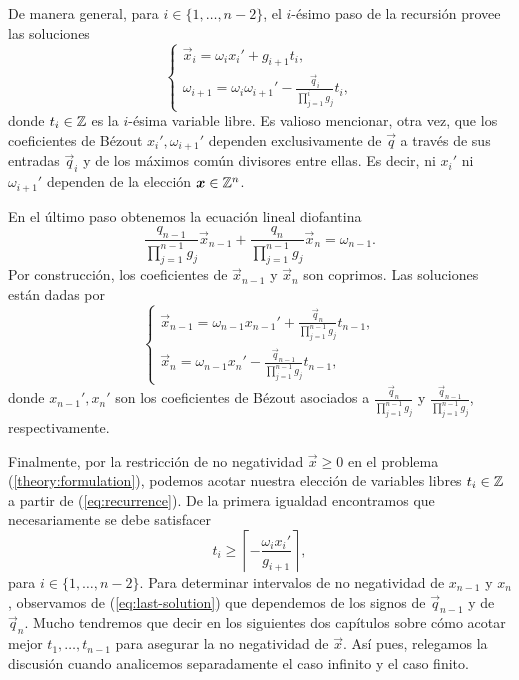 De manera general, para $i \in \lbrace 1, \ldots, n - 2 \rbrace$, el $i$-ésimo paso de la recursión
provee las soluciones
\begin{equation}
	\label{eq:recurrence}
	\begin{cases}
		\vec{x}_i = \omega_ix_i' + g_{i + 1}t_i, \\
		\omega_{i + 1} = \omega_i\omega_{i + 1}' - \frac{\vec{q}_i}{\prod_{j=1}^{i}g_j}t_i,
	\end{cases}
\end{equation}
donde $t_i \in \mathbb{Z}$ es la $i$-ésima variable libre. Es valioso mencionar, otra vez, que los
coeficientes de Bézout $x_i', \omega_{i+1}'$ dependen exclusivamente de $\vec{q}$ a través de sus
entradas $\vec{q}_i$ y de los máximos común divisores entre ellas. Es decir, ni $x_i'$ ni $\omega_{i
+ 1}'$ dependen de la elección $\boldsymbol{x} \in \mathbb{Z}^n$.

En el último paso obtenemos la ecuación lineal diofantina
\begin{equation}
	\label{eq:last-equation}
	\frac{q_{n-1}}{\prod_{j=1}^{n-1}g_j}\vec{x}_{n-1} +
	\frac{q_{n}}{\prod_{j=1}^{n-1}g_j}\vec{x}_n
	= \omega_{n-1}.
\end{equation}
Por construcción, los coeficientes de $\vec{x}_{n - 1}$ y $\vec{x}_n$ son coprimos. Las soluciones
están dadas por
\begin{equation}
	\label{eq:last-solution}
	\begin{cases}
		\vec{x}_{n-1} = \omega_{n-1}x_{n-1}' + \frac{\vec{q}_n}{\prod_{j=1}^{n-1}g_j}t_{n-1}, \\
		\vec{x}_n = \omega_{n-1}x_n' - \frac{\vec{q}_{n-1}}{\prod_{j=1}^{n-1}g_j}t_{n-1},
	\end{cases}
\end{equation}
donde $x_{n-1}', x_n'$ son los coeficientes de Bézout asociados a
$\frac{\vec{q}_n}{\prod_{j=1}^{n-1}g_j}$ y $\frac{\vec{q}_{n-1}}{\prod_{j=1}^{n-1}g_j}$,
respectivamente.

Finalmente, por la restricción de no negatividad $\vec{x} \geq 0$ en el problema
(\ref{theory:formulation}), podemos acotar nuestra elección de variables libres $t_i \in \mathbb{Z}$ a
partir de (\ref{eq:recurrence}). De la primera igualdad encontramos que necesariamente se debe
satisfacer
\begin{equation}
	\label{eq:param-lb}
	t_i \geq \left\lceil -\frac{\omega_ix_i'}{g_{i + 1}} \right\rceil,
\end{equation}
para $i \in \lbrace 1, \ldots, n - 2\rbrace$. Para determinar intervalos de no negatividad de
$x_{n-1}$ y $x_n$, observamos de (\ref{eq:last-solution}) que dependemos de los signos de
$\vec{q}_{n-1}$ y de $\vec{q}_n$. Mucho tendremos que decir en los siguientes dos capítulos sobre
cómo acotar mejor $t_1, \ldots, t_{n-1}$ para asegurar la no negatividad de $\vec{x}$. Así pues,
relegamos la discusión cuando analicemos separadamente el caso infinito y el caso finito.

